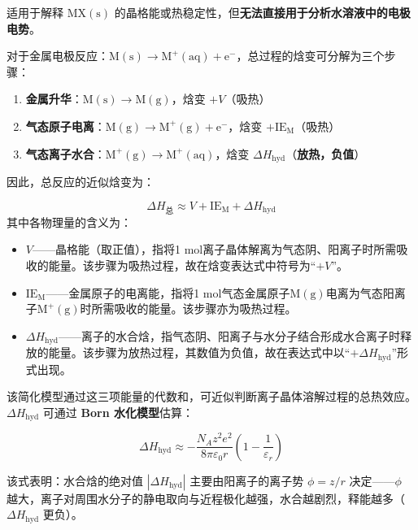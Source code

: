 \documentclass[UTF8]{ctexbook}
\begin{document}
适用于解释 $\mathrm{MX(s)}$ 的晶格能或热稳定性，但\textbf{无法直接用于分析水溶液中的电极电势}。

对于金属电极反应：$\mathrm{M(s) \rightarrow M^+(aq) + e^-}$，总过程的焓变可分解为三个步骤：

\begin{enumerate}
    \item \textbf{金属升华}：$\mathrm{M(s) \rightarrow M(g)}$，焓变 $+V$（吸热）
    \item \textbf{气态原子电离}：$\mathrm{M(g) \rightarrow M^+(g) + e^-}$，焓变 $+\mathrm{IE_M}$（吸热）
    \item \textbf{气态离子水合}：$\mathrm{M^+(g) \rightarrow M^+(aq)}$，焓变 $\Delta H_{\text{hyd}}$（\textbf{放热，负值}）
\end{enumerate}

因此，总反应的近似焓变为：

\[
\Delta H_{\text{总}} \approx V + \mathrm{IE_M} + \Delta H_{\text{hyd}}
\]
其中各物理量的含义为：

\begin{itemize}
    \item $V$——晶格能（取正值），指将1 mol离子晶体解离为气态阴、阳离子时所需吸收的能量。该步骤为吸热过程，故在焓变表达式中符号为“$+V$”。
    
    \item $\mathrm{IE_M}$——金属原子的电离能，指将1 mol气态金属原子$\mathrm{M(g)}$电离为气态阳离子$\mathrm{M^{+}(g)}$时所需吸收的能量。该步骤亦为吸热过程。
    
    \item $\Delta H_{\text{hyd}}$——离子的水合焓，指气态阴、阳离子与水分子结合形成水合离子时释放的能量。该步骤为放热过程，其数值为负值，故在表达式中以“$+\Delta H_{\text{hyd}}$”形式出现。
\end{itemize}

该简化模型通过这三项能量的代数和，可近似判断离子晶体溶解过程的总热效应。
$\Delta H_{\text{hyd}}$ 可通过 \textbf{Born 水化模型}估算：

\[
\Delta H_{\mathrm{hyd}} \approx -\frac{N_A z^2 e^2}{8\pi\varepsilon_0 r} \left(1-\frac{1}{\varepsilon_r}\right)
\]

该式表明：水合焓的绝对值 $\left| \Delta H_{\text{hyd}} \right|$ 主要由阳离子的离子势 $\phi = z/r$ 决定——$\phi$ 越大，离子对周围水分子的静电取向与近程极化越强，水合越剧烈，释能越多（$\Delta H_{\text{hyd}}$ 更负）。
\end{document}
